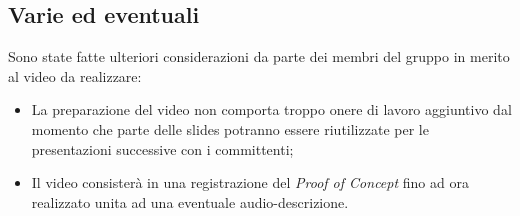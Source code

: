 	\subsection*{Varie ed eventuali}
		Sono state fatte ulteriori considerazioni da parte dei membri del gruppo in merito al video da realizzare:
		\begin{itemize}
			\item La preparazione del video non comporta troppo onere di lavoro aggiuntivo dal momento che parte delle slides potranno essere riutilizzate per le presentazioni successive con i committenti;
			\item Il video consisterà in una registrazione del \textit{Proof of Concept} fino ad ora realizzato unita ad una eventuale audio-descrizione. 
		\end{itemize}